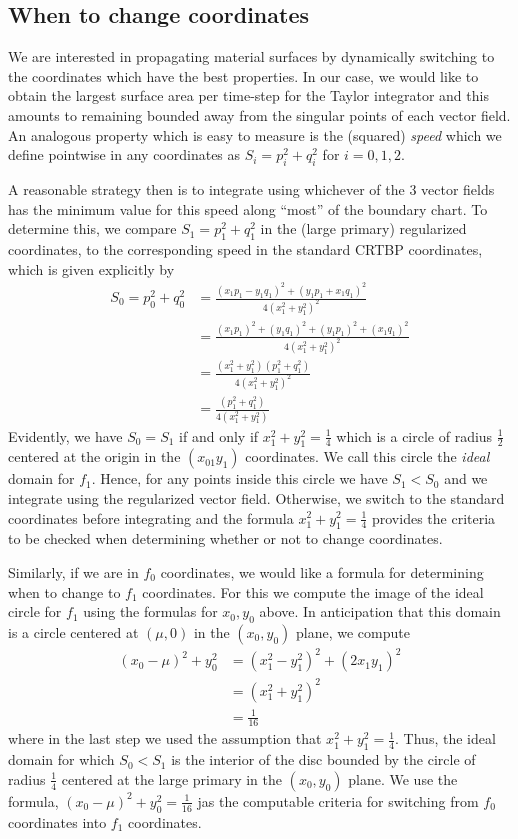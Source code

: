 \documentclass[10pt]{article}
\begin{document}
\subsection{When to change coordinates}
We are interested in propagating material surfaces by dynamically switching to the coordinates which have the best properties.  In our case, we would like to obtain the largest surface area per time-step for the Taylor integrator and this amounts to remaining bounded away from the singular points of each vector field. An analogous property which is easy to measure is the (squared) {\em speed} which we define pointwise in any coordinates as $S_i = p_i^2 + q_i^2 $ for $ i = 0,1,2$. 

A reasonable strategy then is to integrate using whichever of the 3 vector fields has the minimum value for this speed along ``most'' of the boundary chart. To determine this, we compare $S_1 = p_1^2 + q_1^2$ in the (large primary) regularized coordinates, to the corresponding speed in the standard CRTBP coordinates, which is given explicitly by 
\begin{align*}
S_0 = p_0^2 + q_0^2  & = \frac{(x_1p_1-y_1q_1)^2 + (y_1p_1 + x_1q_1)^2}{4(x_1^2 + y_1^2)^2} \\
& = \frac{(x_1p_1)^2 + (y_1q_1)^2 + (y_1p_1)^2 + (x_1q_1)^2}{4(x_1^2 + y_1^2)^2} \\
& = \frac{(x_1^2 + y_1^2)(p_1^2 + q_1^2)}{4(x_1^2 + y_1^2)^2} \\ 
& = \frac{(p_1^2 + q_1^2)}{4(x_1^2 + y_1^2)}
\end{align*}
Evidently, we have $S_0 = S_1$ if and only if $x_1^2 + y_1^2 = \frac{1}{4}$ which is a circle of radius $\frac{1}{2}$ centered at the origin in the $(x_01y_1)$ coordinates. We call this circle the {\em ideal} domain for $f_1$. Hence, for any points inside this circle we have $S_1 < S_0$ and we integrate using the regularized vector field. Otherwise, we switch to the standard coordinates before integrating and the formula $x_1^2 + y_1^2 = \frac{1}{4}$ provides the criteria to be checked when determining whether or not to change coordinates. 

Similarly, if we are in $f_0$ coordinates, we would like a formula for determining when to change to $f_1$ coordinates. For this we compute the image of the ideal circle for $f_1$ using the formulas for $x_0,y_0$ above. In anticipation that this domain is a circle centered at $(\mu,0)$ in the $(x_0,y_0)$ plane, we compute
\begin{align*}
	(x_0 - \mu)^2 + y_0^2 & = (x_1^2 - y_1^2)^2 + (2x_1y_1)^2 \\
	& = (x_1^2 + y_1^2)^2 \\
	& = \frac{1}{16}
\end{align*}
where in the last step we used the assumption that $x_1^2 + y_1^2 = \frac{1}{4}$. Thus, the ideal domain for which $S_0 < S_1$ is the interior of the disc bounded by the circle of radius $\frac{1}{4}$ centered at the large primary in the $(x_0,y_0)$ plane. We use the formula, $(x_0-\mu)^2 + y_0^2 = \frac{1}{16}$ jas the computable criteria for switching from $f_0$ coordinates into $f_1$ coordinates. 
\end{document}
